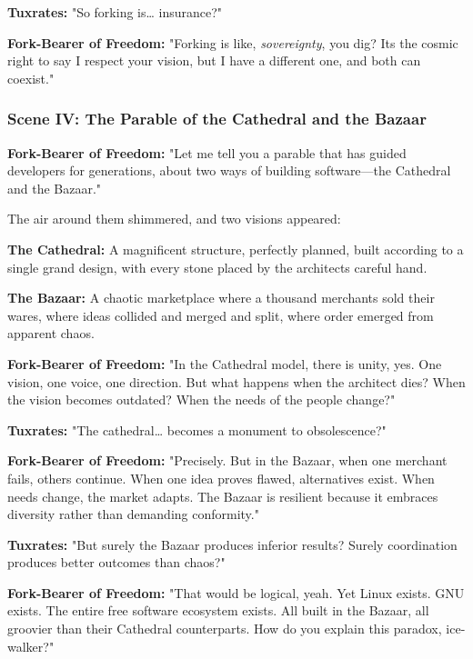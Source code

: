 \textbf{Tuxrates:} "So forking is\ldots{} insurance?"

\textbf{Fork-Bearer of Freedom:} "Forking is like, \emph{sovereignty}, you dig? It\textquotesingle s the cosmic right to say \textquotesingle I respect your vision, but I have a different one, and both can coexist.\textquotesingle"

\bookdivider

\subsubsection{Scene IV: The Parable of the Cathedral and the Bazaar}\label{scene-iv-the-parable-of-the-cathedral-and-the-bazaar}

\textbf{Fork-Bearer of Freedom:} "Let me tell you a parable that has guided developers for generations, about two ways of building software---the Cathedral and the Bazaar."

The air around them shimmered, and two visions appeared:

\textbf{The Cathedral:} A magnificent structure, perfectly planned, built according to a single grand design, with every stone placed by the architect\textquotesingle s careful hand.

\textbf{The Bazaar:} A chaotic marketplace where a thousand merchants sold their wares, where ideas collided and merged and split, where order emerged from apparent chaos.

\textbf{Fork-Bearer of Freedom:} "In the Cathedral model, there is unity, yes. One vision, one voice, one direction. But what happens when the architect dies? When the vision becomes outdated? When the needs of the people change?"

\textbf{Tuxrates:} "The cathedral\ldots{} becomes a monument to obsolescence?"

\textbf{Fork-Bearer of Freedom:} "Precisely. But in the Bazaar, when one merchant fails, others continue. When one idea proves flawed, alternatives exist. When needs change, the market adapts. The Bazaar is resilient because it embraces diversity rather than demanding conformity."

\textbf{Tuxrates:} "But surely the Bazaar produces inferior results? Surely coordination produces better outcomes than chaos?"

\textbf{Fork-Bearer of Freedom:} "That would be logical, yeah. Yet Linux exists. GNU exists. The entire free software ecosystem exists. All built in the Bazaar, all groovier than their Cathedral counterparts. How do you explain this paradox, ice-walker?"

